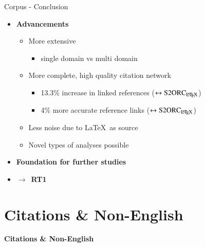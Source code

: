 \documentclass[en,16:9,smallfoot]{sdqbeamer}
\newcommand{\rtmark}[1]{%
    \textbf{{\color{objblue-box}\faCrosshairs}\,RT#1}%
}
\begin{document}
   \begin{frame}{Corpus - Conclusion}
        \begin{itemize}
        \item \textbf{Advancements}
            \begin{itemize}
                \item More extensive
                \begin{itemize}
                    \item single domain vs multi domain
                \end{itemize}
                \item More complete, high quality citation network
                \begin{itemize}
                    \item 13.3\% increase in linked references {\color{contextgrey}($\leftrightarrow \text{S2ORC}_\text{\LaTeX}$)}
                    \item 4\% more accurate reference links {\color{contextgrey}($\leftrightarrow \text{S2ORC}_\text{\LaTeX}$)}
                \end{itemize}
                \item Less noise due to \LaTeX\ as source
                \item Novel types of analyses possible
            \end{itemize}
        \item \textbf{Foundation for further studies}
        \item $\rightarrow$ \rtmark{1\large\checkmark}
        \end{itemize}
   \end{frame}


\section{Citations \& Non-English}

   \begin{frame}[plain]
        \vspace{0.7cm}
        \begin{infobox-map}
        \centering
        \begin{Huge}
        \textbf{Citations \& Non-English}\\
        \end{Huge}
        \end{infobox-map}
   \end{frame}
\end{document}
